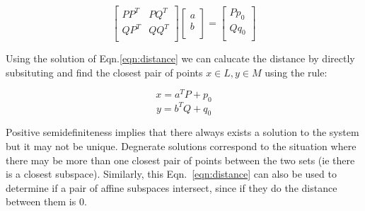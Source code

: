 \documentclass{article}[11pt]
\begin{document}
\begin{equation}
\label{eqn:distance}
\left [ \begin{array}{cc}
P P^T & P Q^T \\
Q P^T & Q Q^T \\
\end{array} \right ]
\left [ \begin{array}{c}
a \\
b \\
\end{array} \right ] = 
\left [ \begin{array}{c}
P p_0 \\
Q q_0 \\
\end{array} \right ]
\end{equation}

Using the solution of Eqn.\ref{eqn:distance} we can calucate the distance by directly subsituting and find the closest pair of points $x \in L, y \in M$  using the rule:

\[ x = a^T P + p_0 \]
\[ y = b^T Q + q_0 \]

Positive semidefiniteness implies that there always exists a solution to the system but it may not be unique.  Degnerate solutions correspond to the situation where there may be more than one closest pair of points between the two sets (ie there is a closest subspace).  Similarly, this Eqn.~\ref{eqn:distance} can also be used to determine if a pair of affine subspaces intersect, since if they do the distance between them is 0.
\end{document}
